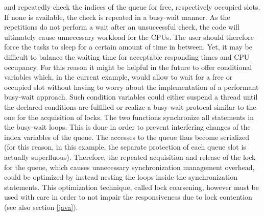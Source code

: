  and  repeatedly check the indices of the queue for free, respectively occupied slots. If none is available, the check is repeated in a busy-wait manner. As the repetitions do not perform a wait after an unsuccessful check, the code will ultimately cause unnecessary workload for the CPUs. The user should therefore force the tasks to sleep for a certain amount of time in between. Yet, it may be difficult to balance the waiting time for acceptable responding times and CPU occupancy. For this reason it might be helpful in the future to offer conditional variables which, in the current example, would allow to wait for a free or occupied slot without having to worry about the implementation of a performant busy-wait approach. Such condition variables could either suspend a thread until the declared conditions are fulfilled or realize a busy-wait protocal similar to the one for the acquisition of locks. The two functions synchronize all statements in the busy-wait loops. This is done in order to prevent interfering changes of the index variables of the queue. The accesses to the queue thus become serialized (for this reason, in this example, the separate protection of each queue slot is actually superfluous). Therefore, the repeated acquisition and release of the lock for the queue, which causes unnecessary synchronization management overhead, could be optimized by instead nesting the loops inside the synchronization statements. This optimization technique, called lock coarsening, however must be used with care in order to not impair the responsiveness due to lock contention (see also section \ref{java}).

